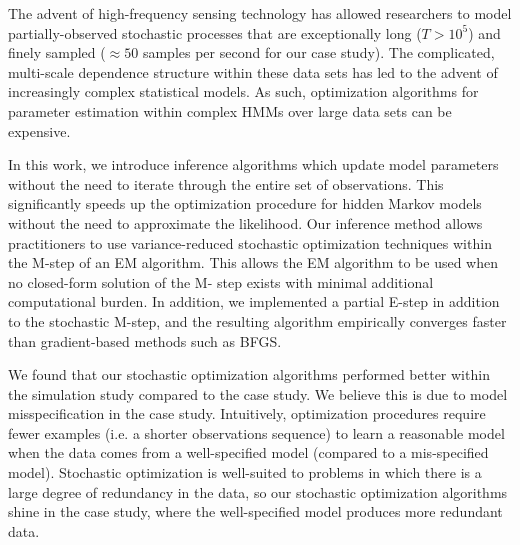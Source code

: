 
The advent of high-frequency sensing technology has allowed researchers to model partially-observed stochastic processes that are exceptionally long ($T > 10^5$) and finely sampled ($\approx 50$ samples per second for our case study). The complicated, multi-scale dependence structure within these data sets has led to the advent of increasingly complex statistical models. As such, optimization algorithms for parameter estimation within complex HMMs over large data sets can be expensive.

In this work, we introduce inference algorithms which update model parameters without the need to iterate through the entire set of observations. This significantly speeds up the optimization procedure for hidden Markov models without the need to approximate the likelihood. Our inference method allows practitioners to use variance-reduced stochastic optimization techniques within the M-step of an EM algorithm. This allows the EM algorithm to be used when no closed-form solution of the M- step exists with minimal additional computational burden. In addition, we implemented a partial E-step in addition to the stochastic M-step, and the resulting algorithm empirically converges faster than gradient-based methods such as BFGS.

We found that our stochastic optimization algorithms performed better within the simulation study compared to the case study. We believe this is due to model misspecification in the case study. Intuitively, optimization procedures require fewer examples (i.e. a shorter observations sequence) to learn a reasonable model when the data comes from a well-specified model (compared to a mis-specified model). Stochastic optimization is well-suited to problems in which there is a large degree of redundancy in the data, so our stochastic optimization algorithms shine in the case study, where the well-specified model produces more redundant data. 

%
%


